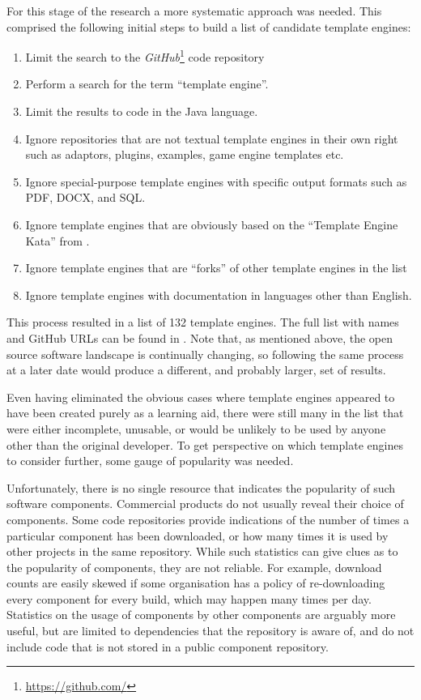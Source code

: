 For this stage of the research a more systematic approach was needed. This comprised the following initial steps to build a list of candidate \gls{template engine}s:

\begin{enumerate}
    \parsep
    \item Limit the search to the \emph{GitHub}\footnote{\url{https://github.com/}} code repository
    \item Perform a search for the term \enquote{\gls{template engine}}.
    \item Limit the results to code in the Java language.
    \item Ignore repositories that are not textual \gls{template engine}s in their own right such as adaptors, plugins, examples, game engine templates etc.
    \item Ignore special-purpose \gls{template engine}s with specific output formats such as PDF, DOCX, and SQL.
    \item Ignore \gls{template engine}s that are obviously based on the \enquote{Template Engine Kata} from \citet{Koskela2007}.
    \item Ignore \gls{template engine}s that are \enquote{forks} of other \gls{template engine}s in the list
    \item Ignore \gls{template engine}s with documentation in languages other than English.
\end{enumerate}

This process resulted in a list of 132 \gls{template engine}s. The full list with names and GitHub URLs can be found in . Note that, as mentioned above, the open source software landscape is continually changing, so following the same process at a later date would produce a different, and probably larger, set of results.

Even having eliminated the obvious cases where \gls{template engine}s appeared to have been created purely as a learning aid, there were still many in the list that were either incomplete, unusable, or would be unlikely to be used by anyone other than the original developer. To get perspective on which \gls{template engine}s to consider further, some gauge of popularity was needed.

Unfortunately, there is no single resource that indicates the popularity of such software components. Commercial products do not usually reveal their choice of components. Some code repositories provide indications of the number of times a particular component has been downloaded, or how many times it is used by other projects in the same repository. While such statistics can give clues as to the popularity of components, they are not reliable. For example, download counts are easily skewed if some organisation has a policy of re-downloading every component for every build, which may happen many times per day. Statistics on the usage of components by other components are arguably more useful, but are limited to dependencies that the repository is aware of, and do not include code that is not stored in a public component repository.

